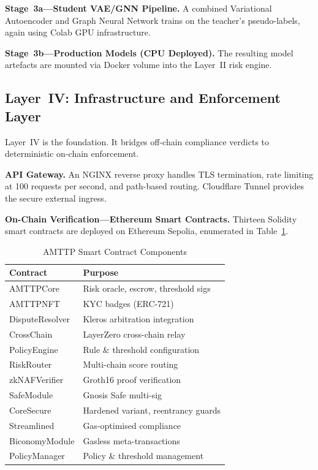 \documentclass[journal]{IEEEtran}
\begin{document}
\textbf{Stage~3a---Student VAE/GNN Pipeline.} A combined Variational Autoencoder and Graph Neural Network trains on the teacher's pseudo-labels, again using Colab GPU infrastructure.

\textbf{Stage~3b---Production Models (CPU Deployed).} The resulting model artefacts are mounted via Docker volume into the Layer~II risk engine.

\subsection{Layer~IV: Infrastructure and Enforcement Layer}

Layer~IV is the foundation. It bridges off-chain compliance verdicts to deterministic on-chain enforcement.

\textbf{API Gateway.} An NGINX reverse proxy handles TLS termination, rate limiting at 100 requests per second, and path-based routing. Cloudflare Tunnel provides the secure external ingress.

\textbf{On-Chain Verification---Ethereum Smart Contracts.} Thirteen Solidity smart contracts are deployed on Ethereum Sepolia, enumerated in Table~\ref{tab:contracts}.

\begin{table}[!t]
\centering
\caption{AMTTP Smart Contract Components}
\label{tab:contracts}
\begin{tabular}{ll}
\toprule
\textbf{Contract} & \textbf{Purpose} \\
\midrule
AMTTPCore & Risk oracle, escrow, threshold sigs \\
AMTTPNFT & KYC badges (ERC-721) \\
DisputeResolver & Kleros arbitration integration \\
CrossChain & LayerZero cross-chain relay \\
PolicyEngine & Rule \& threshold configuration \\
RiskRouter & Multi-chain score routing \\
zkNAFVerifier & Groth16 proof verification \\
SafeModule & Gnosis Safe multi-sig \\
CoreSecure & Hardened variant, reentrancy guards \\
Streamlined & Gas-optimised compliance \\
BiconomyModule & Gasless meta-transactions \\
PolicyManager & Policy \& threshold management \\
\bottomrule
\end{tabular}
\end{table}
\end{document}
